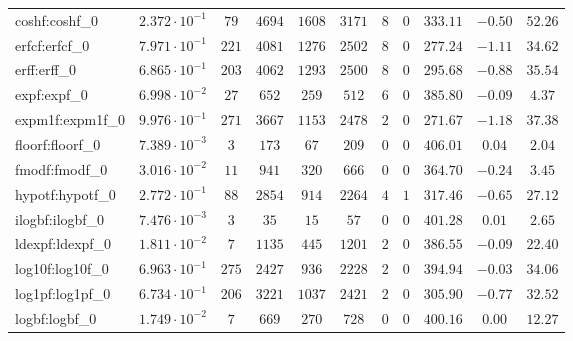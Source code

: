 \begin{tabular}{|l|c|c|c|c|c|c|c|c|c|c|}
coshf:coshf\_0               & $ 2.372 \cdot 10^{-1} $ & $ 79     $ & $ 4694  $ & $ 1608  $ & $ 3171  $ & $ 8   $ & $ 0 $ & $ 333.11      $ & $ -0.50   $ & $ 52.26   $ \\
erfcf:erfcf\_0               & $ 7.971 \cdot 10^{-1} $ & $ 221    $ & $ 4081  $ & $ 1276  $ & $ 2502  $ & $ 8   $ & $ 0 $ & $ 277.24      $ & $ -1.11   $ & $ 34.62   $ \\
erff:erff\_0                 & $ 6.865 \cdot 10^{-1} $ & $ 203    $ & $ 4062  $ & $ 1293  $ & $ 2500  $ & $ 8   $ & $ 0 $ & $ 295.68      $ & $ -0.88   $ & $ 35.54   $ \\
expf:expf\_0                 & $ 6.998 \cdot 10^{-2} $ & $ 27     $ & $ 652   $ & $ 259   $ & $ 512   $ & $ 6   $ & $ 0 $ & $ 385.80      $ & $ -0.09   $ & $ 4.37    $ \\
expm1f:expm1f\_0             & $ 9.976 \cdot 10^{-1} $ & $ 271    $ & $ 3667  $ & $ 1153  $ & $ 2478  $ & $ 2   $ & $ 0 $ & $ 271.67      $ & $ -1.18   $ & $ 37.38   $ \\
floorf:floorf\_0             & $ 7.389 \cdot 10^{-3} $ & $ 3      $ & $ 173   $ & $ 67    $ & $ 209   $ & $ 0   $ & $ 0 $ & $ 406.01      $ & $ 0.04    $ & $ 2.04    $ \\
fmodf:fmodf\_0               & $ 3.016 \cdot 10^{-2} $ & $ 11     $ & $ 941   $ & $ 320   $ & $ 666   $ & $ 0   $ & $ 0 $ & $ 364.70      $ & $ -0.24   $ & $ 3.45    $ \\
hypotf:hypotf\_0             & $ 2.772 \cdot 10^{-1} $ & $ 88     $ & $ 2854  $ & $ 914   $ & $ 2264  $ & $ 4   $ & $ 1 $ & $ 317.46      $ & $ -0.65   $ & $ 27.12   $ \\
ilogbf:ilogbf\_0             & $ 7.476 \cdot 10^{-3} $ & $ 3      $ & $ 35    $ & $ 15    $ & $ 57    $ & $ 0   $ & $ 0 $ & $ 401.28      $ & $ 0.01    $ & $ 2.65    $ \\
ldexpf:ldexpf\_0             & $ 1.811 \cdot 10^{-2} $ & $ 7      $ & $ 1135  $ & $ 445   $ & $ 1201  $ & $ 2   $ & $ 0 $ & $ 386.55      $ & $ -0.09   $ & $ 22.40   $ \\
log10f:log10f\_0             & $ 6.963 \cdot 10^{-1} $ & $ 275    $ & $ 2427  $ & $ 936   $ & $ 2228  $ & $ 2   $ & $ 0 $ & $ 394.94      $ & $ -0.03   $ & $ 34.06   $ \\
log1pf:log1pf\_0             & $ 6.734 \cdot 10^{-1} $ & $ 206    $ & $ 3221  $ & $ 1037  $ & $ 2421  $ & $ 2   $ & $ 0 $ & $ 305.90      $ & $ -0.77   $ & $ 32.52   $ \\
logbf:logbf\_0               & $ 1.749 \cdot 10^{-2} $ & $ 7      $ & $ 669   $ & $ 270   $ & $ 728   $ & $ 0   $ & $ 0 $ & $ 400.16      $ & $ 0.00    $ & $ 12.27   $ \\

\end{tabular}
